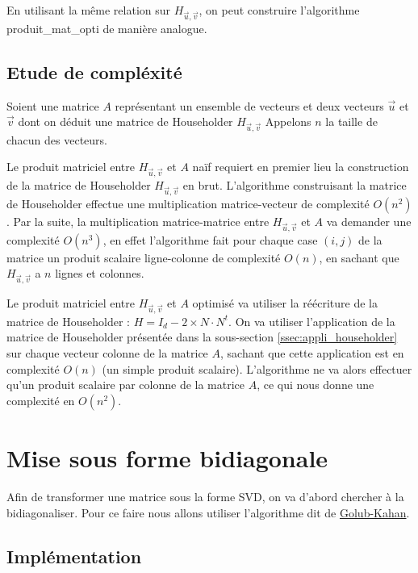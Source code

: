 \documentclass{article}
\begin{document}
En utilisant la même relation sur $H_{\vec{u},\vec{v}}$, on peut construire l'algorithme produit\_mat\_opti de manière analogue.

\subsection{Etude de compléxité}
\label{ssec:complex_householder}

Soient une matrice $A$ représentant un ensemble de vecteurs et deux vecteurs $\vec{u}$ et $\vec{v}$ dont
on déduit une matrice de Householder $H_{\vec{u},\vec{v}}$
Appelons $n$ la taille de chacun des vecteurs. \newline

Le produit matriciel entre $H_{\vec{u},\vec{v}}$ et $A$ naïf requiert en premier lieu la construction de 
la matrice de Householder $H_{\vec{u},\vec{v}}$ en brut. L'algorithme construisant la matrice de Householder
effectue une multiplication matrice-vecteur de complexité $O(n^2)$. Par la suite, la multiplication matrice-matrice
entre $H_{\vec{u},\vec{v}}$ et $A$ va demander une complexité $O(n^3)$, en effet l'algorithme fait pour chaque
case $(i,j)$ de la matrice un produit scalaire ligne-colonne de complexité $O(n)$, en sachant que $H_{\vec{u},\vec{v}}$ a $n$ lignes
et colonnes.

Le produit matriciel entre $H_{\vec{u},\vec{v}}$ et $A$ optimisé va utiliser la réécriture de la matrice de Householder :
$H = I_d - 2 \times N \cdot N^t$. 
On va utiliser l'application de la matrice de Householder présentée dans la sous-section \ref{ssec:appli_householder} sur 
chaque vecteur colonne de la matrice $A$, sachant que cette application est en complexité $O(n)$ (un simple produit scalaire).
L'algorithme ne va alors effectuer qu'un produit scalaire par colonne de la matrice $A$, ce qui nous donne une complexité en $O(n^2)$.

\section{Mise sous forme bidiagonale}
\label{sec:forme_bidiag_}

Afin de transformer une matrice sous la forme SVD, on va d'abord chercher à la bidiagonaliser.
Pour ce faire nous allons utiliser l'algorithme dit de \href{https://en.wikipedia.org/wiki/Bidiagonalization}{Golub-Kahan}.

\subsection{Implémentation}
\label{ssec:implem_bidiag_}
\end{document}
